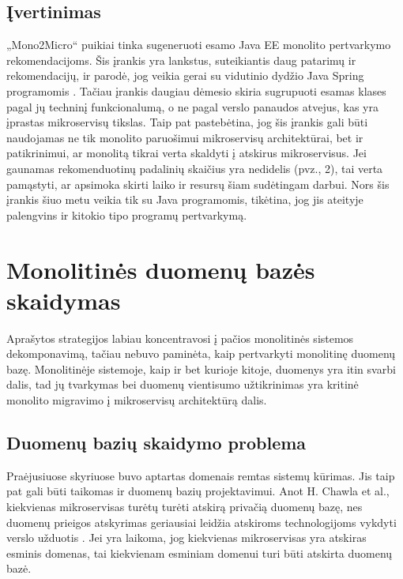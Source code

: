 \documentclass[fleqn]{VUMIFPSkursinis}
\begin{document}
\subsection{Įvertinimas}
„Mono2Micro“ puikiai tinka sugeneruoti esamo Java EE monolito pertvarkymo rekomendacijoms. Šis įrankis yra lankstus, suteikiantis daug patarimų ir rekomendacijų, ir parodė, jog veikia gerai su vidutinio dydžio Java Spring programomis \cite{San21}. Tačiau įrankis daugiau dėmesio skiria sugrupuoti esamas klases pagal jų techninį funkcionalumą, o ne pagal verslo panaudos atvejus, kas yra įprastas mikroservisų tikslas. Taip pat pastebėtina, jog šis įrankis gali būti naudojamas ne tik monolito paruošimui mikroservisų architektūrai, bet ir patikrinimui, ar monolitą tikrai verta skaldyti į atskirus mikroservisus. Jei gaunamas rekomenduotinų padalinių skaičius yra nedidelis (pvz., 2), tai verta pamąstyti, ar apsimoka skirti laiko ir resursų šiam sudėtingam darbui. Nors šis įrankis šiuo metu veikia tik su Java programomis, tikėtina, jog jis ateityje palengvins ir kitokio tipo programų pertvarkymą.

\section{Monolitinės duomenų bazės skaidymas}
Aprašytos strategijos labiau koncentravosi į pačios monolitinės sistemos dekomponavimą, tačiau nebuvo paminėta, kaip pertvarkyti monolitinę duomenų bazę. Monolitinėje sistemoje, kaip ir bet kurioje kitoje, duomenys yra itin svarbi dalis, tad jų tvarkymas bei duomenų vientisumo užtikrinimas yra kritinė monolito migravimo į mikroservisų architektūrą dalis.

\subsection{Duomenų bazių skaidymo problema}
Praėjusiuose skyriuose buvo aptartas domenais remtas sistemų kūrimas. Jis taip pat gali būti taikomas ir duomenų bazių projektavimui. Anot H. Chawla et al., kiekvienas mikroservisas turėtų turėti atskirą privačią duomenų bazę, nes duomenų prieigos atskyrimas geriausiai leidžia atskiroms technologijoms vykdyti verslo užduotis \cite{CK19}. Jei yra laikoma, jog kiekvienas mikroservisas yra atskiras esminis domenas, tai kiekvienam esminiam domenui turi būti atskirta duomenų bazė.
\end{document}
